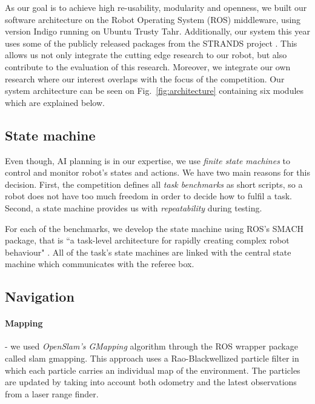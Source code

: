 As our goal is to achieve high re-usability, modularity and openness, we built our software architecture on the Robot Operating System (ROS) middleware, using version Indigo \cite{ros} running on Ubuntu Trusty Tahr. 
Additionally, our system this year uses some of the publicly released packages from the STRANDS project \cite{strands}. 
This allows us not only integrate the cutting edge research to our robot, but also contribute to the evaluation of this research. 
Moreover, we integrate our own research where our interest overlaps with the focus of the competition.
Our system architecture can be seen on Fig.~\ref{fig:architecture} containing six modules which are explained below.

\subsection{State machine}

Even though, AI planning is in our expertise, we use \textit{finite state machines} to control and monitor robot's states and actions. 
We have two main reasons for this decision. First, the competition defines all \textit{task benchmarks} as short scripts, so a robot does not have too much freedom in order to decide how to fulfil a task. Second, a state machine provides us with \textit{repeatability} during testing.

For each of the benchmarks, we develop the state machine using ROS's SMACH package, that is ``a task-level architecture for rapidly creating complex robot behaviour" \cite{smach}. 
All of the task's state machines are linked with the central state machine which communicates with the referee box. 



\subsection{Navigation}

\paragraph{Mapping} - we used \textit{OpenSlam's GMapping} algorithm \cite{slam} through the ROS wrapper package called \textsf{slam gmapping}. This approach uses a Rao-Blackwellized particle filter in which each particle carries an individual map of the environment. The particles are updated by taking into account both odometry and the latest observations from a laser range finder.

